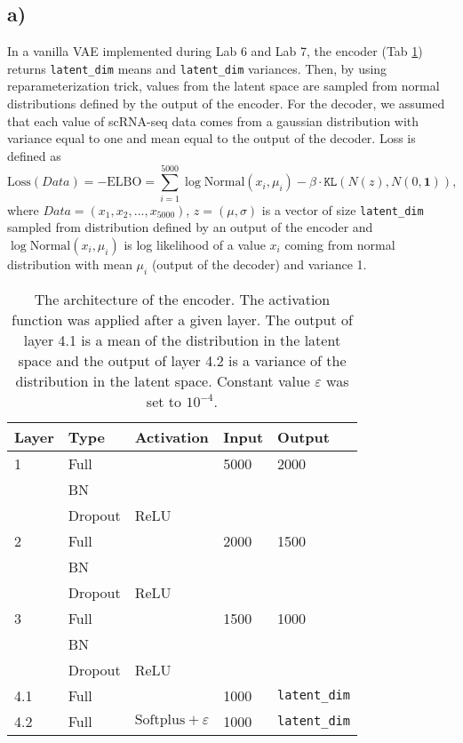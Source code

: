 \documentclass[a4paper,11pt]{article}
\begin{document}
\subsection*{a)}
In a vanilla VAE implemented during Lab 6 and Lab 7, the encoder (Tab \ref{encoder1}) returns \texttt{latent\_dim} means and \texttt{latent\_dim} variances. Then, by using reparameterization trick, values from the latent space are sampled from normal distributions defined by the output of the encoder.
For the decoder, we assumed that each value of scRNA-seq data comes from a gaussian distribution with variance equal to one and mean equal to the output of the decoder. Loss is defined as
\begin{equation}
    \text{Loss}(Data) = -\text{ELBO} = \sum_{i = 1}^{5000} \log{\text{Normal}(x_i, \mu_i)}-\beta \cdot \texttt{KL}(N(z), N(0, \mathbf{1})),
\end{equation}
where $Data = (x_1, x_2, ..., x_{5000})$, $z = (\mu, \sigma)$ is a vector of size \texttt{latent\_dim} sampled from distribution defined by an output of the encoder and $\log{\text{Normal}(x_i, \mu_i)}$ is log likelihood of a value $x_i$ coming from normal distribution with mean $\mu_i$ (output of the decoder) and variance 1.
\begin{table}[H]
\centering
\begin{tabular}{|l l l l l|}
\hline
 \textbf{Layer} & \textbf{Type} &  \textbf{Activation} &  \textbf{Input} &  \textbf{Output} \\ \hline
 1 & Full &   &  5000 &  2000 \\ \
  & BN &   &   &    \\ \
  & Dropout &  ReLU &   &    \\ \hline
 2 & Full &   &  2000 &  1500 \\ \
  & BN &   &   &   \\ \
  & Dropout &  ReLU &   &    \\ \hline
 3 & Full &   &  1500 &  1000 \\ \
  & BN &   &   &   \\ \
  & Dropout &  ReLU &   &    \\ \hline
 4.1 & Full &   &  1000 &  \texttt{latent\_dim}\\ \hline
 4.2 & Full &  $\text{Softplus} + \varepsilon$ &  1000 &  \texttt{latent\_dim} \\ \hline
\end{tabular}
\caption{The architecture of the encoder. The activation function was applied after a given layer. The output of layer 4.1 is a mean of the distribution in the latent space and the output of layer 4.2 is a variance of the distribution in the latent space. Constant value $\varepsilon$ was set to $10^{-4}$.}
\label{encoder1}
\end{table}
\end{document}

